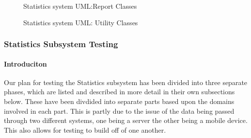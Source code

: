 ﻿\documentclass{article}
\begin{document}
\begin{figure}[H]
    \centering
    \begin{center}
    \end{center}
    \caption{Statistics system UML:Report Classes}
    \label{fig:my_label}
\end{figure}
\begin{figure}[H]
    \centering
    \begin{center}
    \end{center}
    \caption{Statistics system UML: Utility Classes}
    \label{fig:my_label}
\end{figure}
\pagebreak

\subsubsection{Statistics Subsystem Testing}

\paragraph{Introduciton}
Our plan for testing the Statistics subsystem has been divided into three separate phases, which are listed and described in more detail in their own subsections below. These have been divdided into separate parts based upon the domains involved in each part. This is partly due to the issue of the data being passed through two different systems, one being a server the other being a mobile device. This also allows for testing to build off of one another.
\end{document}
